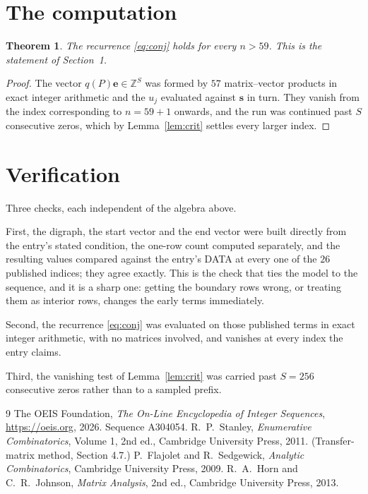 \documentclass[11pt,a4paper]{article}
\theoremstyle{plain}
\newtheorem{theorem}{Theorem}
\theoremstyle{definition}
\begin{document}
\section{The computation}

\begin{theorem}
The recurrence \eqref{eq:conj} holds for every $n>59$. This is the statement of
Section~1.
\end{theorem}

\begin{proof}
The vector $q(P)\mathbf{e}\in\mathbb{Z}^{S}$ was formed by $57$ matrix--vector
products in exact integer arithmetic and the $u_j$ evaluated against $\mathbf{s}$ in turn.
They vanish from the index corresponding to $n=59+1$ onwards, and the run was continued
past $S$ consecutive zeros, which by Lemma~\ref{lem:crit} settles every larger index.
\end{proof}

\section{Verification}

Three checks, each independent of the algebra above.

First, the digraph, the start vector and the end vector were built directly from the
entry's stated condition, the one-row count computed separately, and the resulting values
compared against the entry's DATA at every one of the $26$ published indices; they
agree exactly. This is the check that ties the model to the sequence, and it is a sharp one:
getting the boundary rows wrong, or treating them as interior rows, changes the early terms
immediately.

Second, the recurrence \eqref{eq:conj} was evaluated on those published terms in exact
integer arithmetic, with no matrices involved, and vanishes at every index the entry claims.

Third, the vanishing test of Lemma~\ref{lem:crit} was carried past $S=256$ consecutive
zeros rather than to a sampled prefix.

\begin{thebibliography}{9}
 The OEIS Foundation, \emph{The On-Line Encyclopedia of Integer
Sequences}, \url{https://oeis.org}, 2026. Sequence A304054.
 R.~P.~Stanley, \emph{Enumerative Combinatorics}, Volume 1, 2nd ed.,
Cambridge University Press, 2011. (Transfer-matrix method, Section 4.7.)
 P.~Flajolet and R.~Sedgewick, \emph{Analytic Combinatorics}, Cambridge
University Press, 2009.
 R.~A.~Horn and C.~R.~Johnson, \emph{Matrix Analysis}, 2nd ed., Cambridge
University Press, 2013.
\end{thebibliography}
\end{document}
